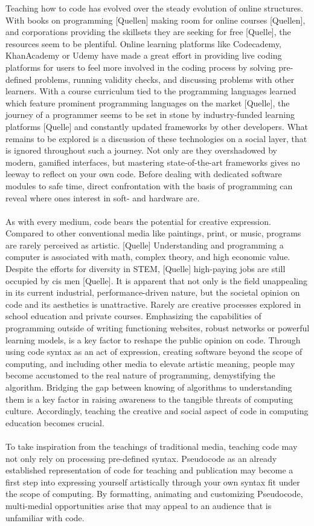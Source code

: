 Teaching how to code has evolved over the steady evolution of online structures. With books on programming [Quellen] making room for online courses [Quellen], and corporations providing the skillsets they are seeking for free [Quelle], the resources seem to be plentiful. Online learning platforms like Codecademy, KhanAcademy or Udemy have made a great effort in providing live coding platforms for users to feel more involved in the coding process by solving pre-defined problems, running validity checks, and discussing problems with other learners. With a course curriculum tied to the programming languages learned which feature prominent programming languages on the market [Quelle], the journey of a programmer seems to be set in stone by industry-funded learning platforms [Quelle] and constantly updated frameworks by other developers. What remains to be explored is a discussion of these technologies on a social layer, that is ignored throughout such a journey. Not only are they overshadowed by modern, gamified interfaces, but mastering state-of-the-art frameworks gives no leeway to reflect on your own code. Before dealing with dedicated software modules to safe time, direct confrontation with the basis of programming can reveal where ones interest in soft- and hardware are. \\ \\
As with every medium, code bears the potential for creative expression. Compared to other conventional media like paintings, print, or music, programs are rarely perceived as artistic. [Quelle] Understanding and programming a computer is associated with math, complex theory, and high economic value. Despite the efforts for diversity in STEM, [Quelle] high-paying jobs are still occupied by cis men [Quelle]. It is apparent that not only is the field unappealing in its current industrial, performance-driven nature, but the societal opinion on code and its aesthetics is unattractive. Rarely are creative processes explored in school education and private courses. Emphasizing the capabilities of programming outside of writing functioning websites, robust networks or powerful learning models, is a key factor to reshape the public opinion on code. Through using code syntax as an act of expression, creating software beyond the scope of computing, and including other media to elevate artistic meaning, people may become accustomed to the real nature of programming, demystifying the algorithm. Bridging the gap between knowing of algorithms to understanding them is a key factor in raising awareness to the tangible threats of computing culture. Accordingly, teaching the creative and social aspect of code in computing education becomes crucial. \\ \\ 
To take inspiration from the teachings of traditional media, teaching code may not only rely on processing pre-defined syntax. Pseudocode as an already established representation of code for teaching and publication may become a first step into expressing yourself artistically through your own syntax fit under the scope of computing. By formatting, animating and customizing Pseudocode, multi-medial opportunities arise that may appeal to an audience that is unfamiliar with code.
